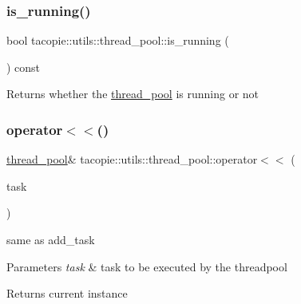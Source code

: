 \subsubsection{\texorpdfstring{is\+\_\+running()}{is\_running()}}
{\footnotesize\ttfamily bool tacopie\+::utils\+::thread\+\_\+pool\+::is\+\_\+running (\begin{DoxyParamCaption}\item[{void}]{ }\end{DoxyParamCaption}) const}

\begin{DoxyReturn}{Returns}
whether the \hyperlink{classtacopie_1_1utils_1_1thread__pool}{thread\+\_\+pool} is running or not 
\end{DoxyReturn}
\mbox{\label{classtacopie_1_1utils_1_1thread__pool_afb7befd9fa5f1fbd44423fddc8cbc5d3}} 
\subsubsection{\texorpdfstring{operator$<$$<$()}{operator<<()}}
{\footnotesize\ttfamily \hyperlink{classtacopie_1_1utils_1_1thread__pool}{thread\+\_\+pool}\& tacopie\+::utils\+::thread\+\_\+pool\+::operator$<$$<$ (\begin{DoxyParamCaption}\item[{const \hyperlink{classtacopie_1_1utils_1_1thread__pool_a8ae8886fdeaa8e5c0abad12626a47296}{task\+\_\+t} \&}]{task }\end{DoxyParamCaption})}

same as add\+\_\+task


\begin{DoxyParams}{Parameters}
{\em task} & task to be executed by the threadpool \\
\hline
\end{DoxyParams}
\begin{DoxyReturn}{Returns}
current instance 
\end{DoxyReturn}
\mbox{\label{classtacopie_1_1utils_1_1thread__pool_a7c7ae922cedff8fa323828ebb6dea829}} 
